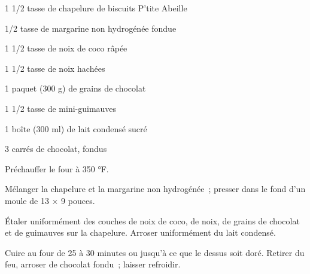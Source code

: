


\totaltime{}


\begin{ingredients}
    \item 1 1/2 tasse de chapelure de biscuits P'tite Abeille
    \item 1/2 tasse de margarine non hydrogénée fondue
    \item 1 1/2 tasse de noix de coco râpée
    \item 1 1/2 tasse de noix hachées
    \item 1 paquet (300 g) de grains de chocolat
    \item 1 1/2 tasse de mini-guimauves
    \item 1 boîte (300 ml) de lait condensé sucré
    \item 3 carrés de chocolat, fondus
\end{ingredients}

\begin{steps}
    \item Préchauffer le four à 350 °F.
    \item Mélanger la chapelure et la margarine non hydrogénée ; presser dans le fond d’un moule de 13 × 9 pouces.
    \item Étaler uniformément des couches de noix de coco, de noix, de grains de chocolat et de guimauves sur la chapelure. Arroser uniformément du lait condensé.
    \item Cuire au four de 25 à 30 minutes ou jusqu’à ce que le dessus soit doré. Retirer du feu, arroser de chocolat fondu ; laisser refroidir.
\end{steps}

